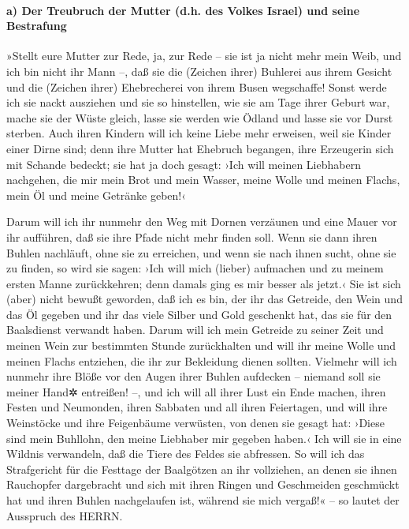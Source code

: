 \hypertarget{a-der-treubruch-der-mutter-d.h.-des-volkes-israel-und-seine-bestrafung}{%
\paragraph{a) Der Treubruch der Mutter (d.h. des Volkes Israel) und
seine
Bestrafung}\label{a-der-treubruch-der-mutter-d.h.-des-volkes-israel-und-seine-bestrafung}}

 »Stellt eure Mutter zur Rede, ja, zur Rede -- sie ist ja
nicht mehr mein Weib, und ich bin nicht ihr Mann --, daß sie die
(Zeichen ihrer) Buhlerei aus ihrem Gesicht und die (Zeichen ihrer)
Ehebrecherei von ihrem Busen wegschaffe!  Sonst werde ich
sie nackt ausziehen und sie so hinstellen, wie sie am Tage ihrer Geburt
war, mache sie der Wüste gleich, lasse sie werden wie Ödland und lasse
sie vor Durst sterben.  Auch ihren Kindern will ich keine
Liebe mehr erweisen, weil sie Kinder einer Dirne sind; 
denn ihre Mutter hat Ehebruch begangen, ihre Erzeugerin sich mit Schande
bedeckt; sie hat ja doch gesagt: ›Ich will meinen Liebhabern nachgehen,
die mir mein Brot und mein Wasser, meine Wolle und meinen Flachs, mein
Öl und meine Getränke geben!‹

 Darum will ich ihr nunmehr den Weg mit Dornen verzäunen
und eine Mauer vor ihr aufführen, daß sie ihre Pfade nicht mehr finden
soll.  Wenn sie dann ihren Buhlen nachläuft, ohne sie zu
erreichen, und wenn sie nach ihnen sucht, ohne sie zu finden, so wird
sie sagen: ›Ich will mich (lieber) aufmachen und zu meinem ersten Manne
zurückkehren; denn damals ging es mir besser als jetzt.‹ 
Sie ist sich (aber) nicht bewußt geworden, daß ich es bin, der ihr das
Getreide, den Wein und das Öl gegeben und ihr das viele Silber und Gold
geschenkt hat, das sie für den Baalsdienst verwandt haben.
 Darum will ich mein Getreide zu seiner Zeit und meinen
Wein zur bestimmten Stunde zurückhalten und will ihr meine Wolle und
meinen Flachs entziehen, die ihr zur Bekleidung dienen sollten.
 Vielmehr will ich nunmehr ihre Blöße vor den Augen ihrer
Buhlen aufdecken -- niemand soll sie meiner Hand✲ entreißen! --,
 und ich will all ihrer Lust ein Ende machen, ihren
Festen und Neumonden, ihren Sabbaten und all ihren Feiertagen,
 und will ihre Weinstöcke und ihre Feigenbäume verwüsten,
von denen sie gesagt hat: ›Diese sind mein Buhllohn, den meine Liebhaber
mir gegeben haben.‹ Ich will sie in eine Wildnis verwandeln, daß die
Tiere des Feldes sie abfressen.  So will ich das
Strafgericht für die Festtage der Baalgötzen an ihr vollziehen, an denen
sie ihnen Rauchopfer dargebracht und sich mit ihren Ringen und
Geschmeiden geschmückt hat und ihren Buhlen nachgelaufen ist, während
sie mich vergaß!« -- so lautet der Ausspruch des HERRN.

